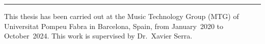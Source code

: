 
\vspace*{\fill}


\begin{center}
	\rule{0.3\textwidth}{.4pt}
\end{center}

This thesis has been carried out at the Music Technology Group (MTG) of Universitat Pompeu Fabra in Barcelona, Spain, from January~2020 to October~2024. This work is supervised by Dr.~Xavier Serra. 